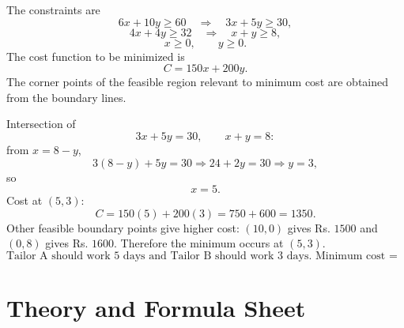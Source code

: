 \documentclass[11pt,a4paper]{article}
\newcommand{\final}[1]{\[\boxed{#1}\]}
\begin{document}
The constraints are
\[
6x+10y\ge 60 \quad \Rightarrow\quad 3x+5y\ge 30,
\]
\[
4x+4y\ge 32 \quad \Rightarrow\quad x+y\ge 8,
\]
\[
x\ge 0,
\qquad y\ge 0.
\]
The cost function to be minimized is
\[
C=150x+200y.
\]
The corner points of the feasible region relevant to minimum cost are obtained from the boundary lines.

Intersection of
\[
3x+5y=30,
\qquad x+y=8:
\]
from $x=8-y$,
\[
3(8-y)+5y=30
\Rightarrow 24+2y=30
\Rightarrow y=3,
\]
so
\[
x=5.
\]
Cost at $(5,3)$:
\[
C=150(5)+200(3)=750+600=1350.
\]
Other feasible boundary points give higher cost: $(10,0)$ gives Rs. $1500$ and $(0,8)$ gives Rs. $1600$.
Therefore the minimum occurs at $(5,3)$.
\final{\text{Tailor A should work 5 days and Tailor B should work 3 days. Minimum cost = Rs. 1350.}}

\begin{center}
\end{center}

\newpage
\section*{Theory and Formula Sheet}
\end{document}
